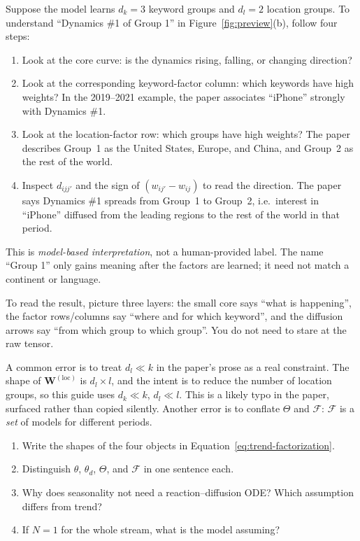 Suppose the model learns $d_k=3$ keyword groups and $d_l=2$ location groups. To understand
``Dynamics \#1 of Group 1'' in Figure~\ref{fig:preview}(b), follow four steps:
\begin{enumerate}
  \item Look at the core curve: is the dynamics rising, falling, or changing direction?
  \item Look at the corresponding keyword-factor column: which keywords have high weights? In the
        2019--2021 example, the paper associates ``iPhone'' strongly with Dynamics \#1.
  \item Look at the location-factor row: which groups have high weights? The paper describes Group~1
        as the United States, Europe, and China, and Group~2 as the rest of the world.
  \item Inspect $d_{ijj'}$ and the sign of $(w_{ij'}-w_{ij})$ to read the direction. The paper says
        Dynamics \#1 spreads from Group~1 to Group~2, i.e.\ interest in ``iPhone'' diffused from the
        leading regions to the rest of the world in that period.
\end{enumerate}
This is \emph{model-based interpretation}, not a human-provided label. The name ``Group 1'' only gains
meaning after the factors are learned; it need not match a continent or language.

\begin{plainwords}
To read the result, picture three layers: the small core says ``what is happening'', the factor
rows/columns say ``where and for which keyword'', and the diffusion arrows say ``from which group to
which group''. You do not need to stare at the raw tensor.
\end{plainwords}

\begin{commonmistake}
A common error is to treat $d_l\ll k$ in the paper's prose as a real constraint. The shape of
$\mathbf{W}^{(\mathrm{loc})}$ is $d_l\times l$, and the intent is to reduce the number of location
groups, so this guide uses $d_k\ll k$, $d_l\ll l$. This is a likely typo in the paper, surfaced rather
than copied silently. Another error is to conflate $\Theta$ and $\mathcal{F}$: $\mathcal{F}$ is a
\emph{set} of models for different periods.
\end{commonmistake}

\begin{selfcheck}
\begin{enumerate}
  \item Write the shapes of the four objects in Equation~\eqref{eq:trend-factorization}.
  \item Distinguish $\theta$, $\theta_d$, $\Theta$, and $\mathcal{F}$ in one sentence each.
  \item Why does seasonality not need a reaction--diffusion ODE? Which assumption differs from trend?
  \item If $N=1$ for the whole stream, what is the model assuming?
\end{enumerate}
\end{selfcheck}
